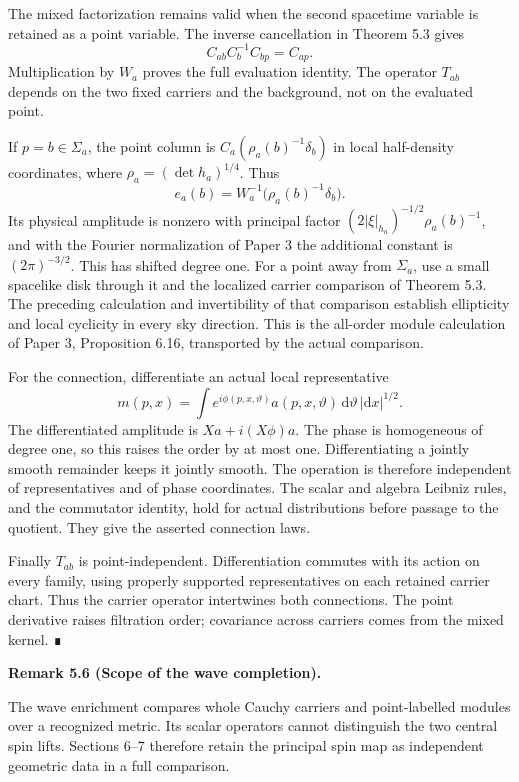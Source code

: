 \documentclass[
  english,
  11pt,
  reqno]{amsart}
\makeatletter
\newcommand{\pandocstatementheading}[1]{%
  \par\if@nobreak\else
    \addpenalty{\@beginparpenalty}%
    \addvspace{.5\baselineskip plus .2\baselineskip minus .2\baselineskip}%
  \fi
  {\normalfont\bfseries #1\par}%
  \nobreak\@afterindenttrue\@afterheading
}
\makeatother
\begin{document}
The mixed factorization remains valid when the second spacetime variable
is retained as a point variable. The inverse cancellation in Theorem 5.3
gives \[
C_{ab}C_b^{-1}C_{bp}=C_{ap}.
\] Multiplication by \(W_a\) proves the full evaluation identity. The
operator \(T_{ab}\) depends on the two fixed carriers and the
background, not on the evaluated point.

If \(p=b\in\Sigma_a\), the point column is
\(C_a(\rho_a(b)^{-1}\delta_b)\) in local half-density coordinates, where
\(\rho_a=(\det h_a)^{1/4}\). Thus \[
e_a(b)=W_a^{-1}\bigl(\rho_a(b)^{-1}\delta_b\bigr).
\] Its physical amplitude is nonzero with principal factor
\((2|\xi|_{h_a})^{-1/2}\rho_a(b)^{-1}\), and with the Fourier
normalization of Paper 3 the additional constant is \((2\pi)^{-3/2}\).
This has shifted degree one. For a point away from \(\Sigma_a\), use a
small spacelike disk through it and the localized carrier comparison of
Theorem 5.3. The preceding calculation and invertibility of that
comparison establish ellipticity and local cyclicity in every sky
direction. This is the all-order module calculation of Paper 3,
Proposition 6.16, transported by the actual comparison.

For the connection, differentiate an actual local representative \[
m(p,x)=\int e^{i\phi(p,x,\vartheta)}
a(p,x,\vartheta)\,\mathrm d\vartheta\,|\mathrm dx|^{1/2}.
\] The differentiated amplitude is \(Xa+i(X\phi)a\). The phase is
homogeneous of degree one, so this raises the order by at most one.
Differentiating a jointly smooth remainder keeps it jointly smooth. The
operation is therefore independent of representatives and of phase
coordinates. The scalar and algebra Leibniz rules, and the commutator
identity, hold for actual distributions before passage to the quotient.
They give the asserted connection laws.

Finally \(T_{ab}\) is point-independent. Differentiation commutes with
its action on every family, using properly supported representatives on
each retained carrier chart. Thus the carrier operator intertwines both
connections. The point derivative raises filtration order; covariance
across carriers comes from the mixed kernel. ∎

\pandocstatementheading{\protect{}\label{rem:scalar-completion-scope}Remark 5.6 (Scope of the wave completion).}

The wave enrichment compares whole Cauchy carriers and point-labelled
modules over a recognized metric. Its scalar operators cannot
distinguish the two central spin lifts. Sections 6--7 therefore retain
the principal spin map as independent geometric data in a full
comparison.
\end{document}
